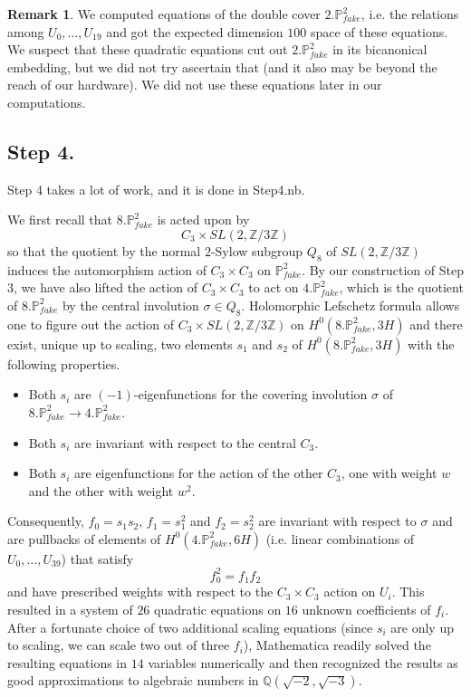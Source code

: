 \documentclass[11pt,reqno]{amsart}
\def\Q {{\mathbb Q}}
\def\Z {{\mathbb Z}}
\def\P {{\mathbb P}}
\def\FPP {{\P^2_{fake}}}
\theoremstyle{definition}
\newtheorem{remark}[theorem]{Remark}
\numberwithin{equation}{section}
\begin{document}
\begin{remark}
We computed equations of the double cover $2.\FPP$, i.e. the relations among $U_0,\ldots,U_{19}$ and got the expected dimension $100$ space of these equations. We suspect that these quadratic equations cut out  $2.\FPP$ in its bicanonical embedding, but we did not try ascertain that (and it also may be beyond the reach of our hardware). We did not use these equations later in our computations.
\end{remark}

\subsection{Step 4.}
Step 4 takes a lot of work, and it is done in Step4.nb. 

\medskip 
We first 
recall that $8.\FPP$ is acted upon
by 
$$
C_3\times SL(2,\Z/3\Z)
$$
so that the quotient by the normal $2$-Sylow subgroup $Q_8$ of $SL(2,\Z/3\Z)$ induces the automorphism action of $C_3\times C_3$ on $\FPP$.  By our construction of Step 3, we have also lifted the action of $C_3\times C_3$ to act on  $4.\FPP$, which is the quotient of $8.\FPP$ by the central involution $\sigma\in Q_8$. Holomorphic Lefschetz formula allows one to figure out the action of $C_3\times SL(2,\Z/3\Z)$ on $H^0(8.\FPP,3H)$ and there exist, unique up to scaling, two elements $s_1$ and $s_2$ of $H^0(8.\FPP,3H)$ with the following properties. 

\begin{itemize}
\item Both $s_i$ are $(-1)$-eigenfunctions for the covering involution $\sigma$ of  $8.\FPP\to 4.\FPP$.
\item Both $s_i$ are invariant with respect to the central $C_3$.
\item Both $s_i$ are eigenfunctions for the action of the other $C_3$, one with weight $w$ and the other with weight $w^2$.
\end{itemize}

Consequently, $f_0 = s_1 s_2$, $f_1=s_1^2$ and $f_2= s_2^2$ are invariant with respect to $\sigma$ and are pullbacks of elements of $H^0(4.\FPP,6H)$ (i.e. linear combinations of $U_0,\ldots,U_{39}$) that satisfy 
\begin{equation}\label{eq2}
f_0^2 = f_1 f_2
\end{equation}
and have prescribed weights with respect to the $C_3\times C_3$ action on $U_i$. This resulted in a system of $26$ quadratic equations on $16$ unknown coefficients of $f_i$. After a fortunate choice of two additional scaling equations (since $s_i$ are only up to scaling, we can scale two out of three $f_i$), Mathematica readily solved the resulting equations in $14$ variables numerically and then recognized the results as good approximations to algebraic numbers in $\Q(\sqrt{-2},\sqrt{-3})$. 
\end{document}
